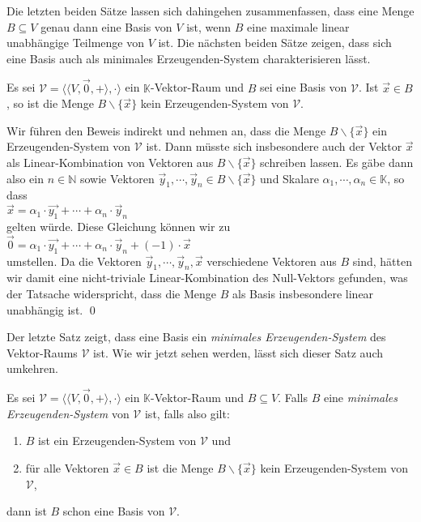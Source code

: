 Die letzten beiden S\"{a}tze lassen sich dahingehen zusammenfassen, dass eine Menge
$B \subseteq V$ genau dann eine Basis von $V$ ist, wenn $B$ eine maximale linear unabh\"{a}ngige
Teilmenge von $V$ ist.  Die n\"{a}chsten beiden S\"{a}tze zeigen, dass sich eine Basis auch als minimales
Erzeugenden-System charakterisieren l\"{a}sst.

\begin{Satz}
  Es sei $\mathcal{V} = \bigl\langle \langle V, \vec{0}, + \rangle, \cdot \bigr\rangle$ ein
  $\mathbb{K}$-Vektor-Raum und $B$ sei eine Basis von $\mathcal{V}$.  Ist $\vec{x} \in B$,
  so ist die Menge $B \backslash \{ \vec{x} \}$ kein Erzeugenden-System von $\mathcal{V}$.
\end{Satz}

\proof
Wir f\"{u}hren den Beweis indirekt und nehmen an, dass die Menge $B \backslash \{ \vec{x} \}$ ein 
Erzeugenden-System von $\mathcal{V}$ ist.  Dann m\"{u}sste sich insbesondere auch der Vektor $\vec{x}$ als
Linear-Kombination von Vektoren aus  $B \backslash \{ \vec{x} \}$ schreiben lassen.  Es g\"{a}be dann
also ein $n \in \mathbb{N}$ sowie Vektoren  $\vec{y}_1, \cdots, \vec{y}_n \in B\backslash \{\vec{x}\}$ und Skalare 
$\alpha_1, \cdots, \alpha_n \in \mathbb{K}$, so dass
\\[0.2cm]
\hspace*{1.3cm}
$\vec{x} = \alpha_1 \cdot \vec{y_1} + \cdots + \alpha_n \cdot \vec{y}_n$
\\[0.2cm]
gelten w\"{u}rde.  Diese Gleichung k\"{o}nnen wir zu
\\[0.2cm]
\hspace*{1.3cm}
$\vec{0} =  \alpha_1 \cdot \vec{y_1} + \cdots + \alpha_n \cdot \vec{y}_n + (-1) \cdot \vec{x}$
\\[0.2cm]
umstellen.  Da die Vektoren $\vec{y}_1, \cdots, \vec{y}_n, \vec{x}$ verschiedene Vektoren aus $B$ sind,
h\"{a}tten wir damit eine nicht-triviale Linear-Kombination des Null-Vektors gefunden, was der Tatsache
widerspricht, dass die Menge $B$ als Basis insbesondere linear unabh\"{a}ngig ist. \qed

Der letzte Satz zeigt, dass eine Basis ein \emph{\color{blue}minimales Erzeugenden-System} des Vektor-Raums $\mathcal{V}$
ist.  Wie wir jetzt sehen werden, l\"{a}sst sich dieser Satz auch umkehren.

\begin{Satz}
  Es sei $\mathcal{V} = \bigl\langle \langle V, \vec{0}, + \rangle, \cdot \bigr\rangle$ ein $\mathbb{K}$-Vektor-Raum 
  und $B \subseteq V$.  Falls $B$ eine \emph{\color{blue}minimales Erzeugenden-System}
  von $\mathcal{V}$ ist, falls also gilt:
  \begin{enumerate}
  \item $B$ ist ein Erzeugenden-System von $\mathcal{V}$ und
  \item f\"{u}r alle Vektoren $\vec{x} \in B$ ist die Menge $B \backslash \{ \vec{x} \}$
        kein Erzeugenden-System von $\mathcal{V}$,
  \end{enumerate}
  dann ist $B$ schon eine Basis von $\mathcal{V}$.
\end{Satz}

